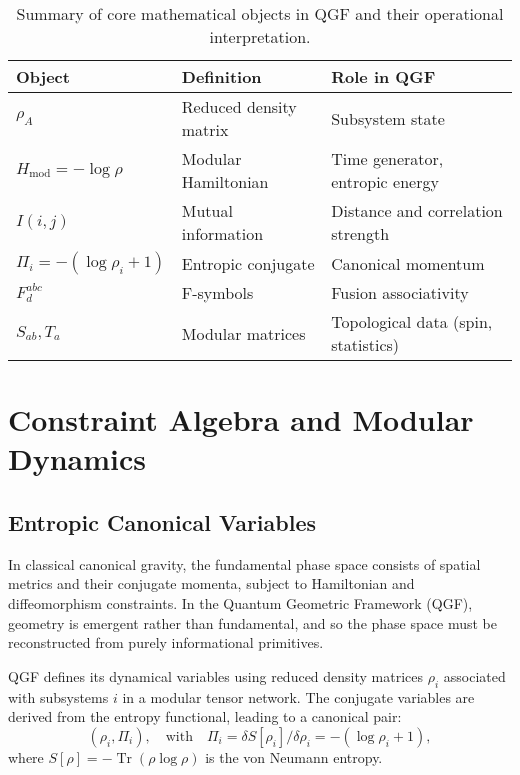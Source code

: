 \documentclass[11pt]{article}
\DeclareMathOperator*{\Tr}{Tr}
\def\frac#1#2{#1/#2}
\def\left{}
\def\right{}
\begin{document}
\begin{table}[H]
\centering
\renewcommand{\arraystretch}{1.2}
\begin{tabular}{|l|l|l|}
\hline
\textbf{Object} & \textbf{Definition} & \textbf{Role in QGF} \\
\hline
\( \rho_A \) & Reduced density matrix & Subsystem state \\
\( H_{\text{mod}} = -\log \rho \) & Modular Hamiltonian & Time generator, entropic energy \\
\( I(i,j) \) & Mutual information & Distance and correlation strength \\
\( \Pi_i = -(\log \rho_i + 1) \) & Entropic conjugate & Canonical momentum \\
\( F^{abc}_d \) & F-symbols & Fusion associativity \\
\( S_{ab}, T_{a} \) & Modular matrices & Topological data (spin, statistics) \\
\hline
\end{tabular}
\caption{Summary of core mathematical objects in QGF and their operational interpretation.}
\label{tab:qgf-core-objects}
\end{table}



\section{Constraint Algebra and Modular Dynamics}

\subsection{Entropic Canonical Variables}

In classical canonical gravity, the fundamental phase space consists of spatial metrics and their conjugate momenta, subject to Hamiltonian and diffeomorphism constraints. In the Quantum Geometric Framework (QGF), geometry is emergent rather than fundamental, and so the phase space must be reconstructed from purely informational primitives.

QGF defines its dynamical variables using reduced density matrices \( \rho_i \) associated with subsystems \( i \) in a modular tensor network. The conjugate variables are derived from the entropy functional, leading to a canonical pair:
\[
\left( \rho_i, \Pi_i \right), \quad \text{with} \quad \Pi_i = \frac{\delta S[\rho_i]}{\delta \rho_i} = -(\log \rho_i + 1),
\]
where \( S[\rho] = -\Tr(\rho \log \rho) \) is the von Neumann entropy.
\end{document}
